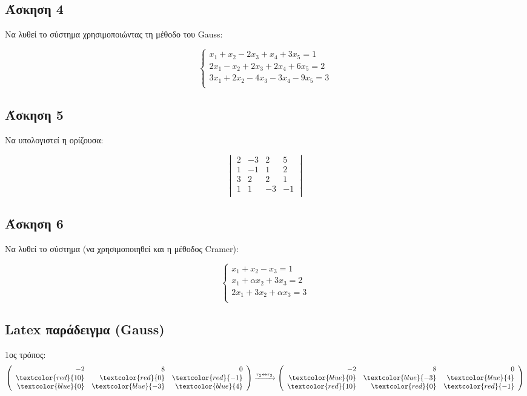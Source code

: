 \documentclass{article}
\begin{document}
\subsection*{Άσκηση 4}
Να λυθεί το σύστημα χρησιμοποιώντας τη μέθοδο του Gauss:

\[
\begin{cases}
x_1 + x_2 - 2x_3 + x_4 + 3x_5 = 1 \\
2x_1 - x_2 + 2x_3 + 2x_4 + 6x_5 = 2 \\
3x_1 + 2x_2 - 4x_3 - 3x_4 - 9x_5 = 3 \\
\end{cases}
\]

\subsection*{Άσκηση 5}
Να υπολογιστεί η ορίζουσα:

\[
\begin{vmatrix}
2 & -3 & 2 & 5 \\
1 & -1 & 1 & 2 \\
3 & 2 & 2 & 1 \\
1 & 1 & -3 & -1 \\
\end{vmatrix}
\]


\subsection*{Άσκηση 6}
Να λυθεί το σύστημα (να χρησιμοποιηθεί και η μέθοδος Cramer):

\[
\begin{cases}
x_1 + x_2 - x_3 = 1 \\
x_1 + \alpha x_2 + 3x_3 = 2 \\
2x_1 + 3x_2 + \alpha x_3 = 3 \\
\end{cases}
\]

\subsection*{Latex παράδειγμα (Gauss)}

1ος τρόπος:
\[
\left(
\begin{array}{rrr}
-2 & 8  & 0 \\
\textcolor{red}{10} & \textcolor{red}{0}  & \textcolor{red}{-1}\\
\textcolor{blue}{0} & \textcolor{blue}{-3}  & \textcolor{blue}{4}\\
\end{array}
\right)
\xrightarrow{r_2 \leftrightarrow r_3}
\left(
\begin{array}{rrr}
-2 & 8  & 0 \\
\textcolor{blue}{0} & \textcolor{blue}{-3}  & \textcolor{blue}{4}\\
\textcolor{red}{10} & \textcolor{red}{0}  & \textcolor{red}{-1}\\
\end{array}
\right)
\]
\end{document}

